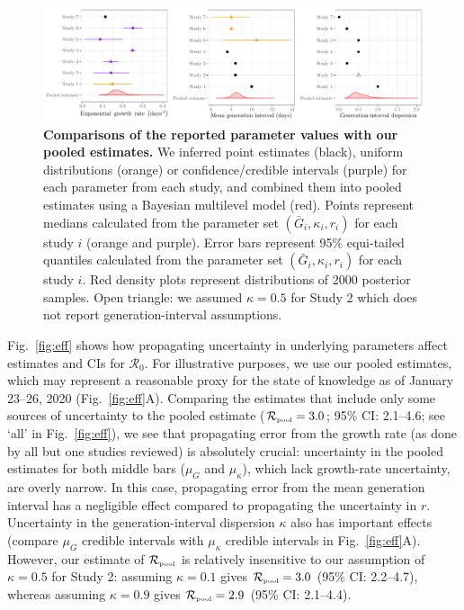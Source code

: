 \documentclass[12pt]{article}
\newcommand{\fref}[1]{Fig.~\ref{fig:#1}}
\newcommand{\Ro}{\ensuremath{{\mathcal R}_{0}}\xspace}
\newcommand{\Rpool}{\ensuremath{{\mathcal R}_{\textrm{\tiny{pool}}}}\xspace}
\begin{document}
\begin{figure}[t]
\includegraphics[width=\textwidth]{compare_assumption.pdf}
\caption{
\textbf{Comparisons of the reported parameter values with our pooled estimates.}
We inferred point estimates (black), uniform distributions (orange) or confidence/credible intervals (purple) for each parameter from each study, and combined them into pooled estimates using a Bayesian multilevel model (red).
Points represent medians calculated from the parameter set $(\bar{G}_{i}, \kappa_{i}, r_{i})$ for each study $i$ (orange and purple).
Error bars represent 95\% equi-tailed quantiles calculated from the parameter set $(\bar{G}_{i}, \kappa_{i}, r_{i})$ for each study $i$.
Red density plots represent distributions of 2000 posterior samples.
Open triangle: we assumed $\kappa=0.5$ for Study 2 which does not report generation-interval assumptions.
}
\label{fig:assumption}
\end{figure}

\fref{eff} shows how propagating uncertainty in underlying parameters affect estimates and CIs for \Ro. 
For illustrative purposes, we use our pooled estimates, which may represent a reasonable proxy for the state of knowledge as of January 23--26, 2020 (\fref{eff}A).
Comparing the estimates that include only some sources of uncertainty to the pooled estimate ($\Rpool = 3.0$; 95\% CI: 2.1--4.6; see `all' in \fref{eff}), we see that propagating error from the growth rate (as done by all but one studies reviewed) is absolutely crucial: uncertainty in the pooled estimates for both middle bars ($\mu_G$ and $\mu_\kappa$), which lack growth-rate uncertainty, are overly narrow.
In this case, propagating error from the mean generation interval has a negligible effect compared to propagating the uncertainty in $r$.
Uncertainty in the generation-interval dispersion $\kappa$ also has important effects (compare $\mu_G$ credible intervals with $\mu_\kappa$ credible intervals in \fref{eff}A).
However, our estimate of \Rpool is relatively insensitive to our assumption of $\kappa=0.5$ for Study 2: assuming $\kappa=0.1$ gives $\Rpool = 3.0$ (95\% CI: 2.2--4.7), whereas assuming $\kappa=0.9$ gives $\Rpool = 2.9$ (95\% CI: 2.1--4.4).
\end{document}
